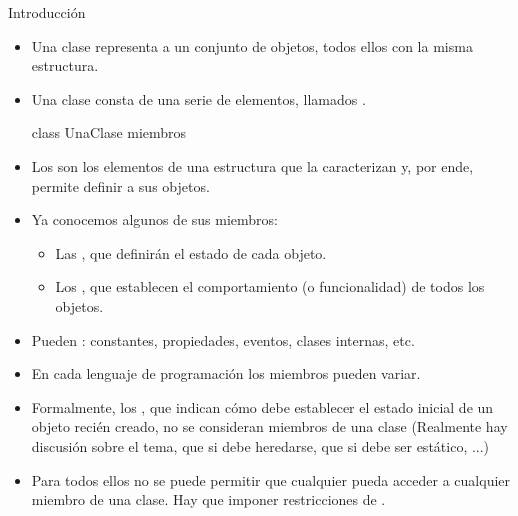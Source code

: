 \documentclass[10pt,envcountsect,spanish]{beamer}
\begin{document}
\begin{frame}[fragile]{Introducción} 

\begin{itemize}
\item Una clase representa a un conjunto de objetos, todos ellos con la misma estructura.
\item Una clase consta de una serie de elementos, llamados .

\begin{code}
class UnaClase {
   miembros
}
\end{code}

\item Los  son los elementos de una estructura que la caracterizan y, por ende, permite definir a sus objetos.


\item Ya conocemos algunos de sus miembros:
	\begin{itemize}
	\item Las , que definirán el estado de cada objeto.
	\item Los , que establecen el comportamiento (o funcionalidad) de todos los objetos.
	\end{itemize}

\item Pueden : constantes, propiedades, eventos, clases internas, etc.

\item En cada lenguaje de programación los miembros pueden variar.

\item Formalmente, los , que indican cómo debe establecer el estado inicial de un objeto recién creado, no se consideran miembros de una clase 
	{\small (Realmente hay discusión sobre el tema, que si debe heredarse, que si debe ser estático, ...)}

\item Para todos ellos no se puede permitir que cualquier pueda acceder a cualquier miembro de una clase. 
Hay que imponer restricciones de .
\end{itemize}

\end{frame}
\end{document}
